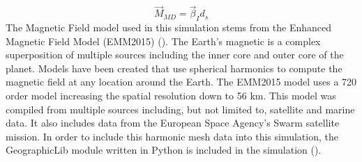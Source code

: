 \documentclass[conf]{new-aiaa}
\begin{document}
\begin{equation}
    \vec{M}_{MD}=\vec{\beta}_I d_s
\end{equation}
The Magnetic Field model used in this simulation stems from the Enhanced Magnetic Field Model (EMM2015) (\cite{EMM2015}). The Earth's magnetic is a complex superposition of multiple sources including the inner core and outer core of the planet. Models have been created that use spherical harmonics to compute the magnetic field at any location around the Earth. The EMM2015 model uses a 720 order model increasing the spatial resolution down to 56 km. This model was compiled from multiple sources including, but not limited to, satellite and marine data. It also includes data from the European Space Agency's Swarm satellite mission. In order to include this harmonic mesh data into this simulation, the GeographicLib module written in Python is included in the simulation (\cite{GeographicLib}). 
\end{document}
